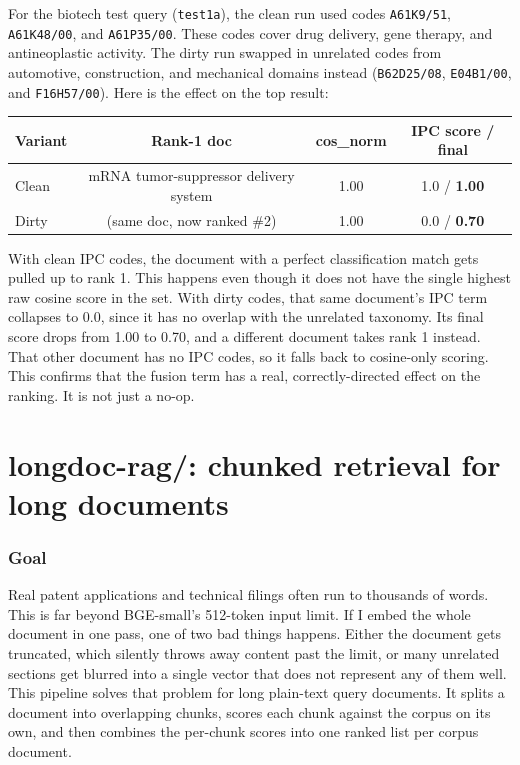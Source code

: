 \documentclass[11pt]{article}
\begin{document}
For the biotech test query (\texttt{test1a}), the clean run used codes
\texttt{A61K9/51}, \texttt{A61K48/00}, and \texttt{A61P35/00}. These codes cover drug
delivery, gene therapy, and antineoplastic activity. The dirty run swapped in
unrelated codes from automotive, construction, and mechanical domains instead
(\texttt{B62D25/08}, \texttt{E04B1/00}, and \texttt{F16H57/00}). Here is the effect
on the top result:

\begin{center}
\small
\begin{tabular}{lccc}
  \toprule
  \textbf{Variant} & \textbf{Rank-1 doc} & \textbf{cos\_norm} & \textbf{IPC score / final} \\
  \midrule
  Clean & mRNA tumor-suppressor delivery system & 1.00 & 1.0 / \textbf{1.00} \\
  Dirty & (same doc, now ranked \#2) & 1.00 & 0.0 / \textbf{0.70} \\
  \bottomrule
\end{tabular}
\end{center}

With clean IPC codes, the document with a perfect classification match gets pulled
up to rank 1. This happens even though it does not have the single highest raw
cosine score in the set. With dirty codes, that same document's IPC term collapses
to 0.0, since it has no overlap with the unrelated taxonomy. Its final score drops
from 1.00 to 0.70, and a different document takes rank 1 instead. That other
document has no IPC codes, so it falls back to cosine-only scoring. This confirms
that the fusion term has a real, correctly-directed effect on the ranking. It is not
just a no-op.

\part{longdoc-rag/: chunked retrieval for long documents}

\section{Goal}

Real patent applications and technical filings often run to thousands of words. This
is far beyond BGE-small's 512-token input limit. If I embed the whole document in
one pass, one of two bad things happens. Either the document gets truncated, which
silently throws away content past the limit, or many unrelated sections get blurred
into a single vector that does not represent any of them well. This pipeline solves
that problem for long plain-text query documents. It splits a document into
overlapping chunks, scores each chunk against the corpus on its own, and then
combines the per-chunk scores into one ranked list per corpus document.
\end{document}
